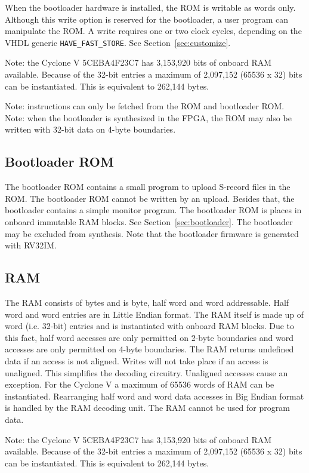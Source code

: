 \documentclass[12pt]{article}
\begin{document}
When the bootloader hardware is installed, the ROM is writable as words only. Although this write option is reserved for the bootloader,  a user program can manipulate the ROM. A write requires one or two clock cycles, depending on the VHDL generic \lstinline|HAVE_FAST_STORE|. See Section~\ref{sec:customize}.

Note: the Cyclone V 5CEBA4F23C7 has 3,153,920 bits of onboard RAM available. Because of the 32-bit entries a maximum of 2,097,152 (65536 x 32) bits can be instantiated. This is equivalent to 262,144 bytes.

Note: instructions can only be fetched from the ROM and bootloader ROM. Note: when the bootloader is synthesized in the FPGA, the ROM may also be written with 32-bit data on 4-byte boundaries.

\subsection{Bootloader ROM}
\label{sec:bootloaderrom}
The bootloader ROM contains a small program to upload S-record files in the ROM. The bootloader ROM cannot be written by an upload. Besides that, the bootloader contains a simple monitor program. The bootloader ROM is places in onboard immutable RAM blocks. See Section~\ref{sec:bootloader}. The bootloader may be excluded from synthesis. Note that the bootloader firmware is generated with RV32IM.

\subsection{RAM}
\label{sec:ram}
The RAM consists of bytes and is byte, half word and word addressable. Half word and word entries are in Little Endian format. The RAM itself is made up of word (i.e. 32-bit) entries and is instantiated with onboard RAM blocks. Due to this fact, half word accesses are only permitted on 2-byte boundaries and word accesses are only permitted on 4-byte boundaries. The RAM returns undefined data if an access is not aligned. Writes will not take place if an access is unaligned. This simplifies the decoding circuitry. Unaligned accesses cause an exception. For the Cyclone V a maximum of 65536 words of RAM can be instantiated. Rearranging half word and word data accesses in Big Endian format is handled by the RAM decoding unit. The RAM cannot be used for program data.

Note: the Cyclone V 5CEBA4F23C7 has 3,153,920 bits of onboard RAM available. Because of the 32-bit entries a maximum of 2,097,152 (65536 x 32) bits can be instantiated. This is equivalent to 262,144 bytes.
\end{document}
